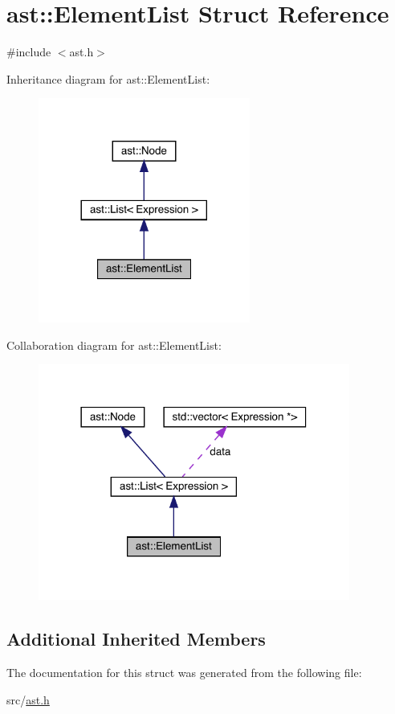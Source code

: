 \hypertarget{structast_1_1_element_list}{}\section{ast\+:\+:Element\+List Struct Reference}
\label{structast_1_1_element_list}


{\ttfamily \#include $<$ast.\+h$>$}



Inheritance diagram for ast\+:\+:Element\+List\+:\nopagebreak
\begin{figure}[H]
\begin{center}
\leavevmode
\includegraphics[width=197pt]{structast_1_1_element_list__inherit__graph}
\end{center}
\end{figure}


Collaboration diagram for ast\+:\+:Element\+List\+:\nopagebreak
\begin{figure}[H]
\begin{center}
\leavevmode
\includegraphics[width=290pt]{structast_1_1_element_list__coll__graph}
\end{center}
\end{figure}
\subsection*{Additional Inherited Members}


The documentation for this struct was generated from the following file\+:\begin{DoxyCompactItemize}
\item 
src/\hyperlink{ast_8h}{ast.\+h}\end{DoxyCompactItemize}
